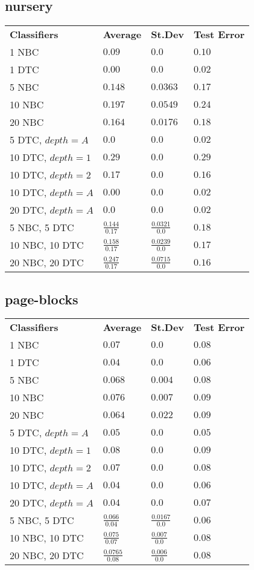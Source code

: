 \documentclass[12pt]{article}
\begin{document}
	\subsection{nursery}
		\begin{tabular}{llll}
		\textbf{Classifiers} & \textbf{Average} & \textbf{St.Dev} & \textbf{Test Error}\\
			1 NBC & $0.09$ & $0.0$ & $0.10$\\
			1 DTC & $0.00$ & $0.0$ & $0.02$\\
			5 NBC & $0.148$ & $0.0363$ & $0.17$\\
			10 NBC & $0.197$ & $0.0549$ & $0.24$\\
			20 NBC & $0.164$ & $0.0176$ & $0.18$\\
			5 DTC, $depth = A$ & $0.0$ & $0.0$ & $0.02$ \\
			10 DTC, $depth = 1$ & $0.29$ & $0.0$ & $0.29$ \\
			10 DTC, $depth = 2$ & $0.17$ & $0.0$ & $0.16$ \\
			10 DTC, $depth = A$ & $0.00$ & $0.0$ & $0.02$ \\
			20 DTC, $depth = A$ & $0.0$ & $0.0$ & $0.02$ \\
			5 NBC, 5 DTC & $\frac{0.144}{0.17}$ & $\frac{0.0321}{0.0}$ & $0.18$ \\
			10 NBC, 10 DTC & $\frac{0.158}{0.17}$ & $\frac{0.0239}{0.0}$ & $0.17$ \\
			20 NBC, 20 DTC & $\frac{0.247}{0.17}$ & $\frac{0.0715}{0.0}$ & $0.16$ \\
		\end{tabular}
		
	\subsection{page-blocks}
		\begin{tabular}{llll}
		\textbf{Classifiers} & \textbf{Average} & \textbf{St.Dev} & \textbf{Test Error}\\
			1 NBC & $0.07$ & $0.0$ & $0.08$\\
			1 DTC & $0.04$ & $0.0$ & $0.06$\\
			5 NBC & $0.068$ & $0.004$ & $0.08$\\
			10 NBC & $0.076$ & $0.007$ & $0.09$\\
			20 NBC & $0.064$ & $0.022$ & $0.09$\\
			5 DTC, $depth = A$ & $0.05$ & $0.0$ & $0.05$ \\
			10 DTC, $depth = 1$ & $0.08$ & $0.0$ & $0.09$ \\
			10 DTC, $depth = 2$ & $0.07$ & $0.0$ & $0.08$ \\
			10 DTC, $depth = A$ & $0.04$ & $0.0$ & $0.06$ \\
			20 DTC, $depth = A$ & $0.04$ & $0.0$ & $0.07$ \\
			5 NBC, 5 DTC & $\frac{0.066}{0.04}$ & $\frac{0.0167}{0.0}$ & $0.06$ \\
			10 NBC, 10 DTC & $\frac{0.075}{0.07}$ & $\frac{0.007}{0.0}$ & $0.08$ \\
			20 NBC, 20 DTC & $\frac{0.0765}{0.08}$ & $\frac{0.006}{0.0}$ & $0.08$ \\
		\end{tabular}
		
\end{document}
